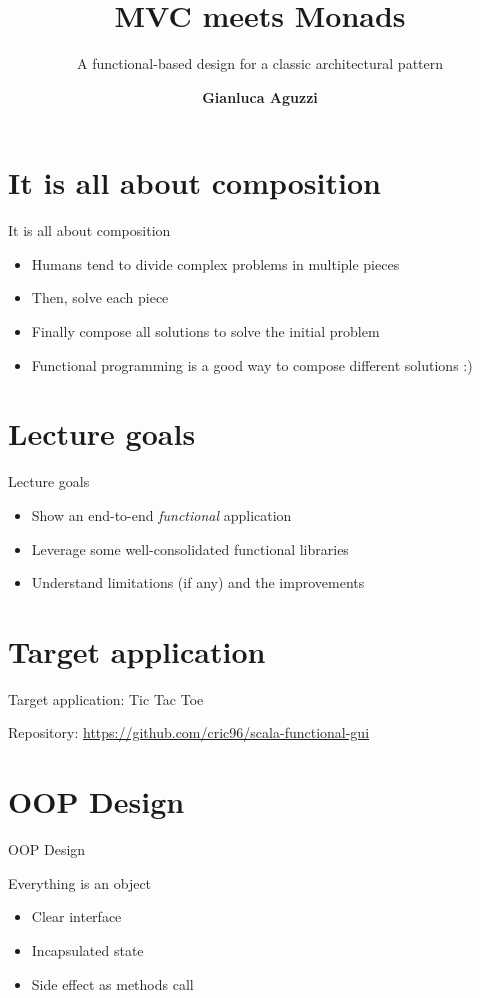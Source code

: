 \documentclass[presentation]{beamer}
\title[MVC Meets Monad]{MVC meets Monads}
\subtitle{A functional-based design for a classic architectural pattern}
\author[G.Aguzzi]
{\textbf{Gianluca Aguzzi}}
\institute[shortinst]{\normalsize 
\textsc{Alma Mater Studiorum}--Universit\`a di Bologna, Cesena, Italy 
}
\let\oldcite\cite
\renewcommand{\cite}[1]{{\color{blue}\oldcite{#1}}}
\begin{document}
\section{It is all about composition}
\begin{frame}[fragile]{It is all about composition \cite{milewski2019category}}
\begin{itemize}
\item Humans tend to divide complex problems in multiple pieces
\item Then, solve each piece
\item Finally compose all solutions to solve the initial problem
\item Functional programming is a good way to compose different solutions :)
\end{itemize}
\section{Lecture goals}
\end{frame}
\begin{frame}[fragile]{Lecture goals}
\begin{itemize}
\item Show an end-to-end \emph{functional} application
\item Leverage some well-consolidated functional libraries
\item Understand limitations (if any) and the improvements
\end{itemize}
\end{frame}
\section{Target application}
\begin{frame}[fragile]{Target application: Tic Tac Toe}
\begin{center}
  Repository: \url{https://github.com/cric96/scala-functional-gui}
\end{center}
\end{frame}
\section{OOP Design}
\begin{frame}[fragile]{OOP Design}
\begin{block}{Everything is an object}
  \begin{itemize}
  \item Clear interface
  \item Incapsulated state
  \item Side effect as methods call
  \end{itemize}
\end{block}
\end{frame}
\end{document}
